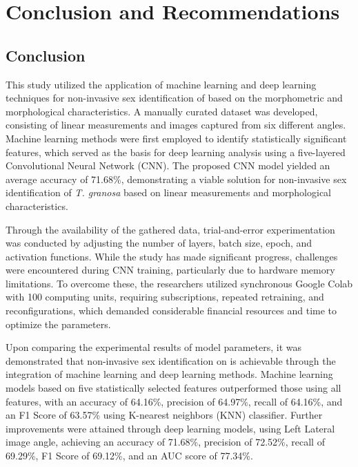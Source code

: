 \chapter{Conclusion and Recommendations}


\section{Conclusion}

This study utilized the application of machine learning and deep learning techniques for non-invasive sex identification of \Tgranosa based on the morphometric and morphological characteristics. A manually curated dataset was developed, consisting of linear measurements and images captured from six different angles. Machine learning methods were first employed to identify statistically significant features, which served as the basis for deep learning analysis using a five-layered Convolutional Neural Network (CNN). The proposed CNN model yielded an average accuracy of 71.68\%, demonstrating a viable solution for non-invasive sex identification of  \textit{T. granosa} based on linear measurements and morphological characteristics.

Through the availability of the gathered data, trial-and-error experimentation was conducted by adjusting the number of layers, batch size, epoch, and activation functions. While the study has made significant progress, challenges were encountered during CNN training, particularly due to hardware memory limitations. To overcome these, the researchers utilized synchronous Google Colab with 100 computing units, requiring subscriptions, repeated retraining, and reconfigurations, which demanded considerable financial resources and time to optimize the parameters. 

Upon comparing the experimental results of model parameters, it was demonstrated that non-invasive sex identification on \Tgranosa is achievable through the integration of machine learning and deep learning methods. Machine learning models based on five statistically selected features outperformed those using all features, with an accuracy of 64.16\%, precision of 64.97\%, recall of 64.16\%, and an F1 Score of 63.57\% using K-nearest neighbors (KNN) classifier. Further improvements were attained through deep learning models, using Left Lateral image angle, achieving an accuracy of 71.68\%, precision of 72.52\%, recall of 69.29\%, F1 Score of 69.12\%, and an AUC score of 77.34\%. 

